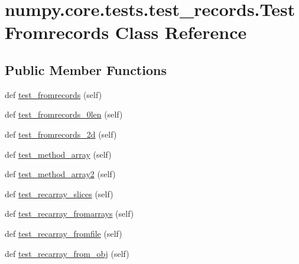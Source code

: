\hypertarget{classnumpy_1_1core_1_1tests_1_1test__records_1_1TestFromrecords}{}\section{numpy.\+core.\+tests.\+test\+\_\+records.\+Test\+Fromrecords Class Reference}
\label{classnumpy_1_1core_1_1tests_1_1test__records_1_1TestFromrecords}
\subsection*{Public Member Functions}
\begin{DoxyCompactItemize}
\item 
def \hyperlink{classnumpy_1_1core_1_1tests_1_1test__records_1_1TestFromrecords_a78ca1e73e7180c6d814099f0d14b15bc}{test\+\_\+fromrecords} (self)
\item 
def \hyperlink{classnumpy_1_1core_1_1tests_1_1test__records_1_1TestFromrecords_a3024dd192e0503b7a367013ded9a4eed}{test\+\_\+fromrecords\+\_\+0len} (self)
\item 
def \hyperlink{classnumpy_1_1core_1_1tests_1_1test__records_1_1TestFromrecords_abdf7b5052909ce38dc172e0c4e45e160}{test\+\_\+fromrecords\+\_\+2d} (self)
\item 
def \hyperlink{classnumpy_1_1core_1_1tests_1_1test__records_1_1TestFromrecords_a633326840cfcc1cd869eec3195e80817}{test\+\_\+method\+\_\+array} (self)
\item 
def \hyperlink{classnumpy_1_1core_1_1tests_1_1test__records_1_1TestFromrecords_a9f150fe4ceb1e6f694ce56516c3a9c4b}{test\+\_\+method\+\_\+array2} (self)
\item 
def \hyperlink{classnumpy_1_1core_1_1tests_1_1test__records_1_1TestFromrecords_a682616ce9c52d648e490f321a35b6642}{test\+\_\+recarray\+\_\+slices} (self)
\item 
def \hyperlink{classnumpy_1_1core_1_1tests_1_1test__records_1_1TestFromrecords_a4afd830e3bfbb6d7f36d6f00e6091ef8}{test\+\_\+recarray\+\_\+fromarrays} (self)
\item 
def \hyperlink{classnumpy_1_1core_1_1tests_1_1test__records_1_1TestFromrecords_ad899b27b3766d3dfdbef65919811c79b}{test\+\_\+recarray\+\_\+fromfile} (self)
\item 
def \hyperlink{classnumpy_1_1core_1_1tests_1_1test__records_1_1TestFromrecords_a463a3b34fb23f28ba1e75116e57f7e78}{test\+\_\+recarray\+\_\+from\+\_\+obj} (self)
\item 

\end{DoxyCompactItemize}

